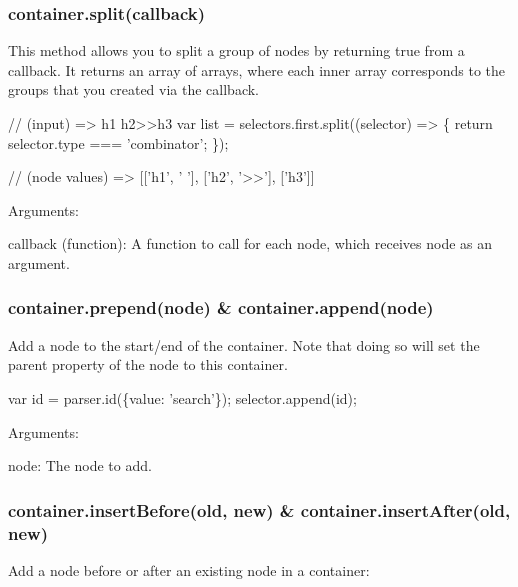 \subsubsection*{{\ttfamily container.\+split(callback)}}

This method allows you to split a group of nodes by returning {\ttfamily true} from a callback. It returns an array of arrays, where each inner array corresponds to the groups that you created via the callback.


\begin{DoxyCode}
// (input) => h1 h2>>h3
var list = selectors.first.split((selector) => \{
    return selector.type === 'combinator';
\});

// (node values) => [['h1', ' '], ['h2', '>>'], ['h3']]
\end{DoxyCode}


Arguments\+:


\begin{DoxyItemize}
\item {\ttfamily callback (function)}\+: A function to call for each node, which receives {\ttfamily node} as an argument.
\end{DoxyItemize}

\subsubsection*{{\ttfamily container.\+prepend(node)} \& {\ttfamily container.\+append(node)}}

Add a node to the start/end of the container. Note that doing so will set the parent property of the node to this container.


\begin{DoxyCode}
var id = parser.id(\{value: 'search'\});
selector.append(id);
\end{DoxyCode}


Arguments\+:


\begin{DoxyItemize}
\item {\ttfamily node}\+: The node to add.
\end{DoxyItemize}

\subsubsection*{{\ttfamily container.\+insert\+Before(old, new)} \& {\ttfamily container.\+insert\+After(old, new)}}

Add a node before or after an existing node in a container\+:


